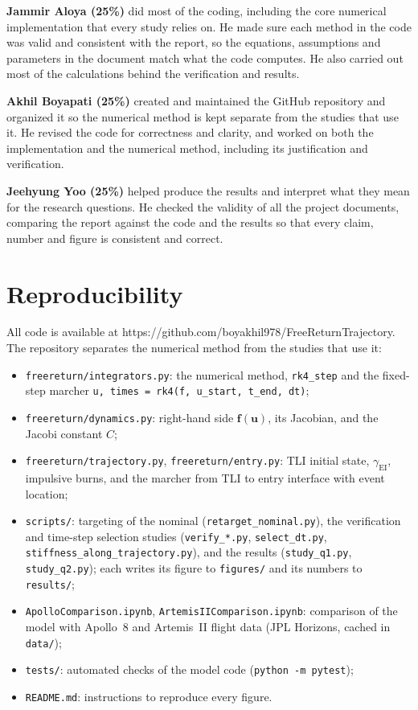 \documentclass[11pt]{article}
\newcommand{\gEI}{\gamma_{\mathrm{EI}}}
\newcommand{\bu}{\mathbf{u}}
\newcommand{\bff}{\mathbf{f}}
\begin{document}
\textbf{Jammir Aloya (25\%)} did most of the coding, including the core numerical implementation that every study relies on. He made sure each method in the code was valid and consistent with the report, so the equations, assumptions and parameters in the document match what the code computes. He also carried out most of the calculations behind the verification and results.

\textbf{Akhil Boyapati (25\%)} created and maintained the GitHub repository and organized it so the numerical method is kept separate from the studies that use it. He revised the code for correctness and clarity, and worked on both the implementation and the numerical method, including its justification and verification.

\textbf{Jeehyung Yoo (25\%)} helped produce the results and interpret what they mean for the research questions. He checked the validity of all the project documents, comparing the report against the code and the results so that every claim, number and figure is consistent and correct.

\section{Reproducibility}

All code is available at https://github.com/boyakhil978/FreeReturnTrajectory. The repository separates the numerical method from the studies that use it:
\begin{itemize}[leftmargin=2em]\sloppy
  \item \texttt{freereturn/integrators.py}: the numerical method, \texttt{rk4\_step} and the fixed-step marcher \texttt{u, times = rk4(f, u\_start, t\_end, dt)};
  \item \texttt{freereturn/dynamics.py}: right-hand side $\bff(\bu)$, its Jacobian, and the Jacobi constant $C$;
  \item \texttt{freereturn/trajectory.py}, \texttt{freereturn/entry.py}: TLI initial state, $\gEI$, impulsive burns, and the marcher from TLI to entry interface with event location;
  \item \texttt{scripts/}: targeting of the nominal (\texttt{retarget\_nominal.py}), the verification and time-step selection studies (\texttt{verify\_*.py}, \texttt{select\_dt.py}, \texttt{stiffness\_along\_trajectory.py}), and the results (\texttt{study\_q1.py}, \texttt{study\_q2.py}); each writes its figure to \texttt{figures/} and its numbers to \texttt{results/};
  \item \texttt{ApolloComparison.ipynb}, \texttt{ArtemisIIComparison.ipynb}: comparison of the model with Apollo~8 and Artemis~II flight data (JPL Horizons, cached in \texttt{data/});
  \item \texttt{tests/}: automated checks of the model code (\texttt{python -m pytest});
  \item \texttt{README.md}: instructions to reproduce every figure.
\end{itemize}
\end{document}

